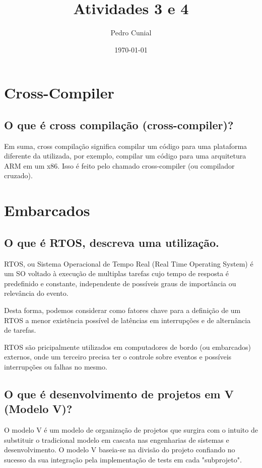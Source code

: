 \documentclass[11pt]{article}
\author{Pedro Cunial}
\date{\today}
\title{Atividades 3 e 4}
\begin{document}
\maketitle
\tableofcontents

\section{Cross-Compiler}
\label{sec:orgheadline2}
\subsection{O que é cross compilação (cross-compiler)?}
\label{sec:orgheadline1}
Em suma, cross compilação significa compilar um código para uma
plataforma diferente da utilizada, por exemplo, compilar um código para uma
arquitetura ARM em um x86. Isso é feito pelo chamado cross-compiler (ou
compilador cruzado).

\section{Embarcados}
\label{sec:orgheadline6}
\subsection{O que é RTOS, descreva uma utilização.}
\label{sec:orgheadline3}
RTOS, ou Sistema Operacional de Tempo Real (Real Time Operating System) é um
SO voltado à execução de multiplas tarefas cujo tempo de resposta é
predefinido e constante, independente de possíveis graus de importância ou
relevância do evento.

Desta forma, podemos considerar como fatores chave para a definição de um RTOS
a menor existência possível de latências em interrupções e de alternância de
tarefas.

RTOS são pricipalmente utilizados em computadores de bordo (ou embarcados)
externos, onde um terceiro precisa ter o controle sobre eventos e possíveis
interrupções ou falhas no mesmo.
\subsection{O que é desenvolvimento de projetos em V (Modelo V)?}
\label{sec:orgheadline4}
O modelo V é um modelo de organização de projetos que surgira com o intuito de
substituir o tradicional modelo em cascata nas engenharias de sistemas e
desenvolvimento. O modelo V baseia-se na divisão do projeto confiando no
sucesso da sua integração pela implementação de tests em cada "subprojeto".
\end{document}
